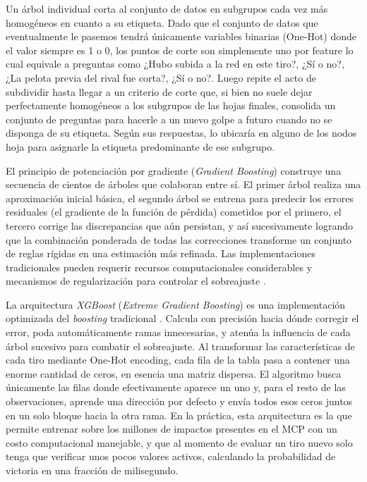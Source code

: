 \documentclass[journal]{IEEEtran}
\begin{document}
Un árbol individual \cite{breiman1984classification} corta al conjunto de datos en subgrupos cada vez más homogéneos en cuanto a su etiqueta. Dado que el conjunto de datos que eventualmente le pasemos tendrá únicamente variables binarias (One-Hot) donde el valor siempre es 1 o 0, los puntos de corte son simplemente uno por feature lo cual equivale a preguntas como ¿Hubo subida a la red en este tiro?, ¿Sí o no?, ¿La pelota previa del rival fue corta?, ¿Sí o no?. Luego repite el acto de subdividir hasta llegar a un criterio de corte que, si bien no suele dejar perfectamente homogéneos a los subgrupos de las hojas finales, consolida un conjunto de preguntas para hacerle a un nuevo golpe a futuro cuando no se disponga de su etiqueta. Según sus respuestas, lo ubicaría en alguno de los nodos hoja para asignarle la etiqueta predominante de ese subgrupo. 

El principio de potenciación por gradiente (\textit{Gradient Boosting}) \cite{hastie2009elements} construye una secuencia de cientos de árboles que colaboran entre sí. El primer árbol realiza una aproximación inicial básica, el segundo árbol se entrena para predecir los errores residuales (el gradiente de la función de pérdida) cometidos por el primero, el tercero corrige las discrepancias que aún persistan, y así sucesivamente logrando que la combinación ponderada de todas las correcciones transforme un conjunto de reglas rígidas en una estimación más refinada. Las implementaciones tradicionales pueden requerir recursos computacionales considerables y mecanismos de regularización para controlar el sobreajuste \cite{hastie2009elements}.

La arquitectura \textit{XGBoost} (\textit{Extreme Gradient Boosting}) es una implementación optimizada del \textit{boosting} tradicional \cite{chen2016xgboost}. Calcula con precisión hacia dónde corregir el error, poda automáticamente ramas innecesarias, y atenúa la influencia de cada árbol sucesivo para combatir el sobreajuste. Al transformar las características de cada tiro mediante One-Hot encoding, cada fila de la tabla pasa a contener una enorme cantidad de ceros, en esencia una matriz dispersa. El algoritmo busca únicamente las filas donde efectivamente aparece un uno y, para el resto de las observaciones, aprende una dirección por defecto y envía todos esos ceros juntos en un solo bloque hacia la otra rama. En la práctica, esta arquitectura es la que permite entrenar sobre los millones de impactos presentes en el MCP con un costo computacional manejable, y que al momento de evaluar un tiro nuevo solo tenga que verificar unos pocos valores activos, calculando la probabilidad de victoria en una fracción de milisegundo.
\end{document}
